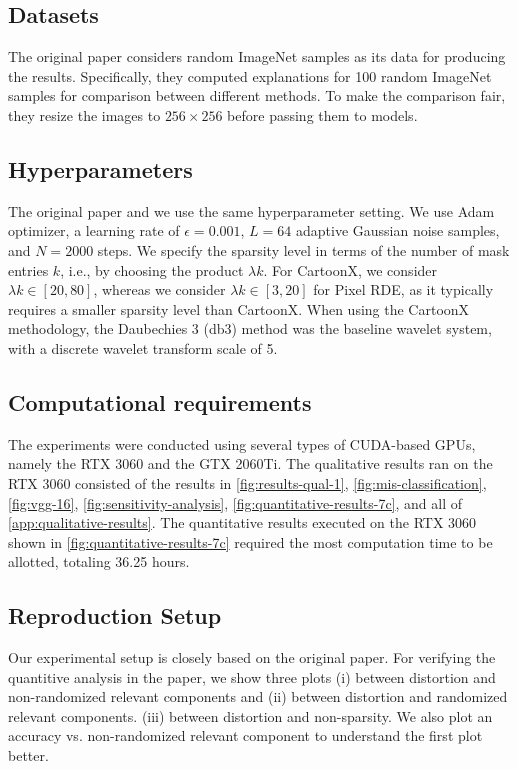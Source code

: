 \subsection{Datasets}
The original paper considers random ImageNet \cite{deng2009imagenet} samples as its data for producing the results. Specifically, they computed explanations for 100 random ImageNet samples for comparison between different methods. To make the comparison fair, they resize the images to $256 \times 256$ before passing them to models.  

\subsection{Hyperparameters}
The original paper and we use the same hyperparameter setting. We use Adam optimizer, a learning rate of $\epsilon=0.001$, $L=64$ adaptive Gaussian noise samples, and $N=2000$ steps. We specify the sparsity level in terms of the number of mask entries $k$, i.e., by choosing the product $\lambda k$. For CartoonX, we consider $\lambda k \in [20, 80]$, whereas we consider $\lambda k \in [3, 20]$ for Pixel RDE, as it typically requires a smaller sparsity level than CartoonX. When using the CartoonX methodology, the Daubechies 3 (db3) method was the baseline wavelet system, with a discrete wavelet transform scale of 5.

\subsection{Computational requirements}

The experiments were conducted using several types of CUDA-based GPUs, namely the RTX 3060 and the GTX 2060Ti. The qualitative results ran on the RTX 3060 consisted of the results in \autoref{fig:results-qual-1}, \autoref{fig:mis-classification}, \autoref{fig:vgg-16}, \autoref{fig:sensitivity-analysis}, \autoref{fig:quantitative-results-7c}, and all of \autoref{app:qualitative-results}. The quantitative results executed on the RTX 3060 shown in \autoref{fig:quantitative-results-7c} required the most computation time to be allotted, totaling 36.25 hours. 
\subsection{Reproduction Setup}
Our experimental setup is closely based on the original paper. For verifying the quantitive analysis in the paper, we show three plots (i) between distortion and non-randomized relevant components and (ii) between distortion and randomized relevant components. (iii) between distortion and non-sparsity. We also plot an accuracy vs. non-randomized relevant component to understand the first plot better. 
